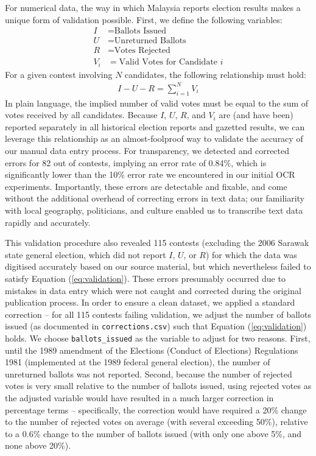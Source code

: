 \documentclass[11pt]{article}
\begin{document}
For numerical data, the way in which Malaysia reports election results makes a unique form of validation possible. First, we define the following variables:
\begin{align*}
	I &= \text{Ballots Issued} \\
	U &= \text{Unreturned Ballots} \\
	R &= \text{Votes Rejected} \\
	V_i &= \text{Valid Votes for Candidate } i
\end{align*}
For a given contest involving $N$ candidates, the following relationship must hold:
\begin{align}
	\label{eq:validation}
	I - U - R = \sum_{i=1}^{N} V_i
\end{align}
In plain language, the implied number of valid votes must be equal to the sum of votes received by all candidates. Because $I$, $U$, $R$, and $V_i$ are (and have been) reported separately in all historical election reports and gazetted results, we can leverage this relationship as an almost-foolproof way to validate the accuracy of our manual data entry process. For transparency, we detected and corrected errors for 82 out of \TOTALCONTESTS\space contests, implying an error rate of 0.84\%, which is significantly lower than the 10\% error rate we encountered in our initial OCR experiments. Importantly, these errors are detectable and fixable, and come without the additional overhead of correcting errors in text data; our familiarity with local geography, politicians, and culture enabled us to transcribe text data rapidly and accurately.

This validation procedure also revealed 115 contests (excluding the 2006 Sarawak state general election, which did not report $I$, $U$, or $R$) for which the data was digitised accurately based on our source material, but which nevertheless failed to satisfy Equation (\ref{eq:validation}). These errors presumably occurred due to mistakes in data entry which were not caught and corrected during the original publication process. In order to ensure a clean dataset, we applied a standard correction -- for all 115 contests failing validation, we adjust the number of ballots issued (as documented in \texttt{corrections.csv}) such that Equation (\ref{eq:validation}) holds. We choose \texttt{ballots\_issued} as the variable to adjust for two reasons. First, until the 1989 amendment of the Elections (Conduct of Elections) Regulations 1981 (implemented at the 1989 federal general election), the number of unreturned ballots was not reported. Second, because the number of rejected votes is very small relative to the number of ballots issued, using rejected votes as the adjusted variable would have resulted in a much larger correction in percentage terms -- specifically, the correction would have required a 20\% change to the number of rejected votes on average (with several exceeding 50\%), relative to a 0.6\% change to the number of ballots issued (with only one above 5\%, and none above 20\%).
\end{document}
